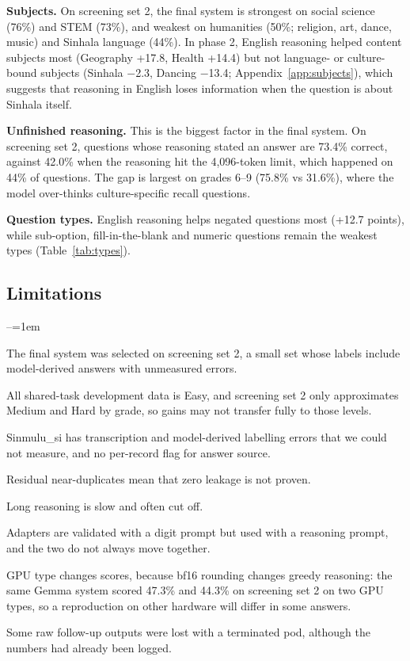 \documentclass[11pt]{article}
\newcommand{\para}[1]{\smallskip\noindent\textbf{#1}\enspace}
\newcommand{\sinmulu}{Sinmulu\_si}
\begin{document}
\para{Subjects.} On screening set 2, the final system is strongest on social science (76\%) and STEM (73\%), and weakest on humanities (50\%; religion, art, dance, music) and Sinhala language (44\%). In phase 2, English reasoning helped content subjects most (Geography +17.8, Health +14.4) but not language- or culture-bound subjects (Sinhala $-$2.3, Dancing $-$13.4; Appendix~\ref{app:subjects}), which suggests that reasoning in English loses information when the question is about Sinhala itself.

\para{Unfinished reasoning.} This is the biggest factor in the final system. On screening set 2, questions whose reasoning stated an answer are 73.4\% correct, against 42.0\% when the reasoning hit the 4,096-token limit, which happened on 44\% of questions. The gap is largest on grades 6--9 (75.8\% vs 31.6\%), where the model over-thinks culture-specific recall questions.

\para{Question types.} English reasoning helps negated questions most (+12.7 points), while sub-option, fill-in-the-blank and numeric questions remain the weakest types (Table~\ref{tab:types}).

\subsection{Limitations}
\begin{list}{--}{\leftmargin=1em\itemindent=0pt\itemsep=1pt\parsep=0pt\topsep=2pt}
\item The final system was selected on screening set 2, a small set whose labels include model-derived answers with unmeasured errors.
\item All shared-task development data is Easy, and screening set 2 only approximates Medium and Hard by grade, so gains may not transfer fully to those levels.
\item \sinmulu{} has transcription and model-derived labelling errors that we could not measure, and no per-record flag for answer source.
\item Residual near-duplicates mean that zero leakage is not proven.
\item Long reasoning is slow and often cut off.
\item Adapters are validated with a digit prompt but used with a reasoning prompt, and the two do not always move together.
\item GPU type changes scores, because bf16 rounding changes greedy reasoning: the same Gemma system scored 47.3\% and 44.3\% on screening set 2 on two GPU types, so a reproduction on other hardware will differ in some answers.
\item Some raw follow-up outputs were lost with a terminated pod, although the numbers had already been logged.
\end{list}
\end{document}
